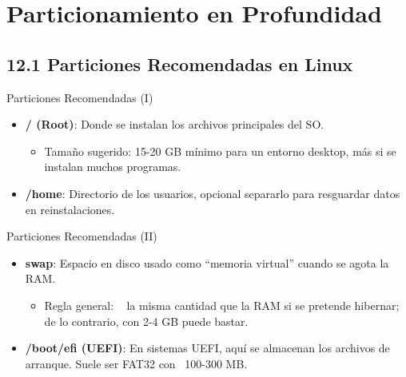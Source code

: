 \documentclass{beamer}
\begin{document}
\section{Particionamiento en Profundidad}

\subsection{12.1 Particiones Recomendadas en Linux}
\begin{frame}{Particiones Recomendadas (I)}
	\begin{itemize}
		\item \textbf{/ (Root)}: Donde se instalan los archivos principales del SO.
			\begin{itemize}
				\item Tamaño sugerido: 15-20 GB mínimo para un entorno desktop, más si se instalan muchos programas.
			\end{itemize}
		\item \textbf{/home}: Directorio de los usuarios, opcional separarlo para resguardar datos en reinstalaciones.
	\end{itemize}
\end{frame}

\begin{frame}{Particiones Recomendadas (II)}
	\begin{itemize}
		\item \textbf{swap}: Espacio en disco usado como “memoria virtual” cuando se agota la RAM.
			\begin{itemize}
				\item Regla general: ~ la misma cantidad que la RAM si se pretende hibernar; de lo contrario, con 2-4 GB puede bastar.
			\end{itemize}
		\item \textbf{/boot/efi (UEFI)}: En sistemas UEFI, aquí se almacenan los archivos de arranque. Suele ser FAT32 con ~100-300 MB.
	\end{itemize}
\end{frame}

\end{document}

